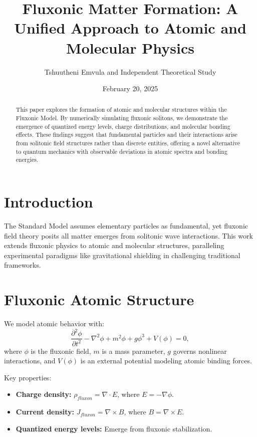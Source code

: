 \documentclass{article}
\title{Fluxonic Matter Formation: A Unified Approach to Atomic and Molecular Physics}
\author{Tshuutheni Emvula and Independent Theoretical Study}
\date{February 20, 2025}
\begin{document}
\maketitle

\begin{abstract}
This paper explores the formation of atomic and molecular structures within the Fluxonic Model. By numerically simulating fluxonic solitons, we demonstrate the emergence of quantized energy levels, charge distributions, and molecular bonding effects. These findings suggest that fundamental particles and their interactions arise from solitonic field structures rather than discrete entities, offering a novel alternative to quantum mechanics with observable deviations in atomic spectra and bonding energies.
\end{abstract}

\section{Introduction}
The Standard Model assumes elementary particles as fundamental, yet fluxonic field theory posits all matter emerges from solitonic wave interactions. This work extends fluxonic physics to atomic and molecular structures, paralleling experimental paradigms like gravitational shielding in challenging traditional frameworks.

\section{Fluxonic Atomic Structure}
We model atomic behavior with:
\begin{equation}
\frac{\partial^2 \phi}{\partial t^2} - \nabla^2 \phi + m^2 \phi + g \phi^3 + V(\phi) = 0,
\end{equation}
where \(\phi\) is the fluxonic field, \(m\) is a mass parameter, \(g\) governs nonlinear interactions, and \(V(\phi)\) is an external potential modeling atomic binding forces.

Key properties:
\begin{itemize}
    \item \textbf{Charge density:} \(\rho_{fluxon} = \nabla \cdot E\), where \(E = -\nabla \phi\).
    \item \textbf{Current density:} \(J_{fluxon} = \nabla \times B\), where \(B = \nabla \times E\).
    \item \textbf{Quantized energy levels:} Emerge from fluxonic stabilization.
\end{itemize}
\end{document}
